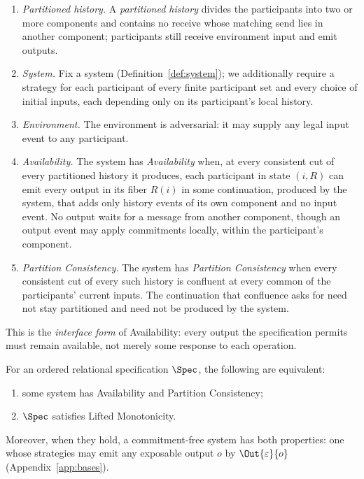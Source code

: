 \begin{definition}
\label{def:partition-notions}
\leavevmode
\begin{enumerate}
  \item \emph{Partitioned history.}  A \emph{partitioned history} divides the
        participants into two or more components and contains no receive whose
        matching send lies in another component; participants still receive
        environment input and emit outputs.
  \item \emph{System.}  Fix a system (Definition~\ref{def:system}); we
        additionally require a strategy for each participant of every finite
        participant set and every choice of initial inputs, each depending only
        on its participant's local history.
  \item \emph{Environment.}  The environment is adversarial: it may supply any
        legal input event to any participant.
  \item \emph{Availability.}  The system has \emph{Availability} when, at every
        consistent cut of every partitioned history it produces, each
        participant in state $(i,R)$ can emit every output in its fiber $R(i)$
        in some continuation, produced by the system, that adds only history events of
        its own component and no input event.  No output waits for a message
        from another component, though an output event may apply commitments
        locally, within the participant's component.
  \item \emph{Partition Consistency.}  The system has \emph{Partition
        Consistency} when every consistent cut of every such history is
        confluent at every common \indesc of the participants' current
        inputs.  The
        continuation that confluence asks for need not stay partitioned and
        need not be produced by the system.
\end{enumerate}
\end{definition}

This is the \emph{interface form} of Availability: every output the
specification permits must remain available, not merely some response to each
operation.

\begin{theorem}
\label{thm:complete-cap}
For an ordered relational specification $\Spec$, the following are equivalent:
\begin{enumerate}
  \item some system has Availability and Partition Consistency;
  \item $\Spec$ satisfies Lifted Monotonicity.
\end{enumerate}
Moreover, when they hold, a commitment-free system has both properties: one
whose strategies may emit any exposable output $o$ by $\Out{\varepsilon}{o}$
(Appendix~\ref{app:bases}).
\end{theorem}

